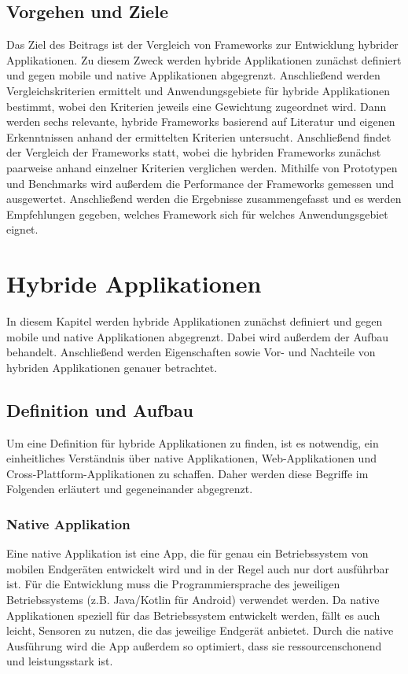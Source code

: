 \documentclass[]{lni}
\begin{document}
\subsection{Vorgehen und Ziele}
Das Ziel des Beitrags ist der Vergleich von Frameworks zur Entwicklung hybrider Applikationen. Zu diesem Zweck werden hybride Applikationen zunächst definiert und gegen mobile und native Applikationen abgegrenzt. Anschließend werden Vergleichskriterien ermittelt und Anwendungsgebiete für hybride Applikationen bestimmt, wobei den Kriterien jeweils eine Gewichtung zugeordnet wird. Dann werden sechs relevante, hybride Frameworks basierend auf Literatur und eigenen Erkenntnissen anhand der ermittelten Kriterien untersucht. Anschließend findet der Vergleich der Frameworks statt, wobei die hybriden Frameworks zunächst paarweise anhand einzelner Kriterien verglichen werden. Mithilfe von Prototypen und Benchmarks wird außerdem die Performance der Frameworks gemessen und ausgewertet. Anschließend werden die Ergebnisse zusammengefasst und es werden Empfehlungen gegeben, welches Framework sich für welches Anwendungsgebiet eignet.

\clearpage

\section{Hybride Applikationen}
In diesem Kapitel werden hybride Applikationen zunächst definiert und gegen mobile und native Applikationen abgegrenzt. Dabei wird außerdem der Aufbau behandelt. Anschließend werden Eigenschaften sowie Vor- und Nachteile von hybriden Applikationen genauer betrachtet.

\subsection{Definition und Aufbau}
Um eine Definition für hybride Applikationen zu finden, ist es notwendig, ein einheitliches Verständnis über native Applikationen, Web-Applikationen und Cross-Plattform-Applikationen zu schaffen. Daher werden diese Begriffe im Folgenden erläutert und gegeneinander abgegrenzt.

\subsubsection*{Native Applikation}
Eine native Applikation ist eine App, die für genau ein Betriebssystem von mobilen Endgeräten entwickelt wird und in der Regel auch nur dort ausführbar ist. Für die Entwicklung muss die Programmiersprache des jeweiligen Betriebssystems (z.B. Java/Kotlin für Android) verwendet werden. Da native Applikationen speziell für das Betriebssystem entwickelt werden, fällt es auch leicht, Sensoren zu nutzen, die das jeweilige Endgerät anbietet. Durch die native Ausführung wird die App außerdem so optimiert, dass sie ressourcenschonend und leistungsstark ist.
\end{document}
